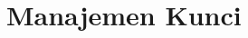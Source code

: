 \documentclass[../buku_kriptografi.tex]{subfiles}
\begin{document}
\ifdefined\InMainDocument\else\setcounter{chapter}{11}\fi

\chapter{Manajemen Kunci}





\ifdefined\InMainDocument\else


\fi
\end{document}
